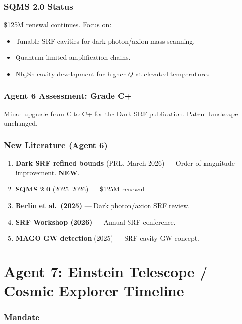 \documentclass[11pt,a4paper]{article}
\newcommand{\NEW}{\textcolor{dfdblue}{\textbf{NEW}}}
\begin{document}
\section{SQMS 2.0 Status}

\$125M renewal continues. Focus on:
\begin{itemize}
\item Tunable SRF cavities for dark photon/axion mass scanning.
\item Quantum-limited amplification chains.
\item Nb$_3$Sn cavity development for higher $Q$ at elevated temperatures.
\end{itemize}

\section{Agent 6 Assessment: Grade C+}

Minor upgrade from C to C+ for the Dark SRF publication. Patent landscape unchanged.

\section{New Literature (Agent 6)}

\begin{enumerate}
\item \textbf{Dark SRF refined bounds} (PRL, March 2026) --- Order-of-magnitude improvement. \NEW.
\item \textbf{SQMS 2.0} (2025--2026) --- \$125M renewal.
\item \textbf{Berlin et al.\ (2025)} --- Dark photon/axion SRF review.
\item \textbf{SRF Workshop (2026)} --- Annual SRF conference.
\item \textbf{MAGO GW detection} (2025) --- SRF cavity GW concept.
\end{enumerate}


\part{Agent 7: Einstein Telescope / Cosmic Explorer Timeline}
\label{part:agent7}

\section{Mandate}
\end{document}
